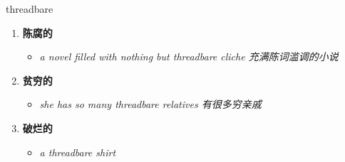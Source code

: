 
\begin{frame}
{\huge threadbare}
\begin{center}
\begin{enumerate}\Large
  \item \textbf{陈腐的}
  \begin{itemize}
    \item \em{\Large{a novel filled with nothing but threadbare cliche 充满陈词滥调的小说}}
  \end{itemize}
  \item \textbf{贫穷的}
  \begin{itemize}
    \item \em{\Large{she has so many threadbare relatives 有很多穷亲戚}}
  \end{itemize}
  \item \textbf{破烂的}
  \begin{itemize}
    \item \em{\Large{a threadbare shirt}}
  \end{itemize}
\end{enumerate}
\end{center}
\end{frame}
